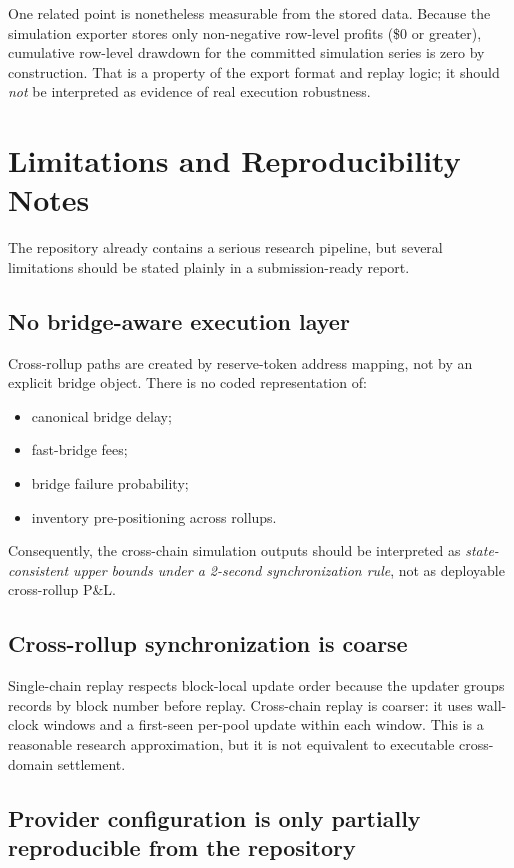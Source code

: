 \documentclass[11pt]{article}
\begin{document}
One related point is nonetheless measurable from the stored data. Because the simulation exporter stores only non-negative row-level profits (\$0 or greater), cumulative row-level drawdown for the committed simulation series is zero by construction. That is a property of the export format and replay logic; it should \emph{not} be interpreted as evidence of real execution robustness.

\section{Limitations and Reproducibility Notes}

The repository already contains a serious research pipeline, but several limitations should be stated plainly in a submission-ready report.

\subsection{No bridge-aware execution layer}

Cross-rollup paths are created by reserve-token address mapping, not by an explicit bridge object. There is no coded representation of:
\begin{itemize}[leftmargin=1.5em]
    \item canonical bridge delay;
    \item fast-bridge fees;
    \item bridge failure probability;
    \item inventory pre-positioning across rollups.
\end{itemize}

Consequently, the cross-chain simulation outputs should be interpreted as \emph{state-consistent upper bounds under a 2-second synchronization rule}, not as deployable cross-rollup P\&L.

\subsection{Cross-rollup synchronization is coarse}

Single-chain replay respects block-local update order because the updater groups records by block number before replay. Cross-chain replay is coarser: it uses wall-clock windows and a first-seen per-pool update within each window. This is a reasonable research approximation, but it is not equivalent to executable cross-domain settlement.

\subsection{Provider configuration is only partially reproducible from the repository}
\end{document}

